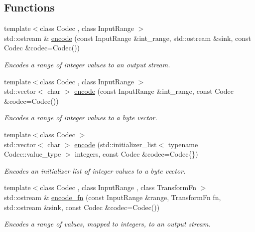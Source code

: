 \subsection*{Functions}
\begin{DoxyCompactItemize}
\item 
{\footnotesize template$<$class Codec , class Input\+Range $>$ }\\std\+::ostream \& \mbox{\hyperlink{namespaceirk_1_1coding_ab9ed90a54275b0b51b3b43a6943e0c5d}{encode}} (const Input\+Range \&int\+\_\+range, std\+::ostream \&sink, const Codec \&codec=Codec())
\begin{DoxyCompactList}\small\item\em Encodes a range of integer values to an output stream. \end{DoxyCompactList}\item 
{\footnotesize template$<$class Codec , class Input\+Range $>$ }\\std\+::vector$<$ char $>$ \mbox{\hyperlink{namespaceirk_1_1coding_a626fc8a444ee503d1210d1a72b14fec3}{encode}} (const Input\+Range \&int\+\_\+range, const Codec \&codec=Codec())
\begin{DoxyCompactList}\small\item\em Encodes a range of integer values to a byte vector. \end{DoxyCompactList}\item 
{\footnotesize template$<$class Codec $>$ }\\std\+::vector$<$ char $>$ \mbox{\hyperlink{namespaceirk_1_1coding_a5a8bcf925049c4f53e3912ed177cd8cc}{encode}} (std\+::initializer\+\_\+list$<$ typename Codec\+::value\+\_\+type $>$ integers, const Codec \&codec=Codec\{\})
\begin{DoxyCompactList}\small\item\em Encodes an initializer list of integer values to a byte vector. \end{DoxyCompactList}\item 
{\footnotesize template$<$class Codec , class Input\+Range , class Transform\+Fn $>$ }\\std\+::ostream \& \mbox{\hyperlink{namespaceirk_1_1coding_a7f925618ccd33c9c9255a9b9219e655f}{encode\+\_\+fn}} (const Input\+Range \&range, Transform\+Fn fn, std\+::ostream \&sink, const Codec \&codec=Codec())
\begin{DoxyCompactList}\small\item\em Encodes a range of values, mapped to integers, to an output stream. \end{DoxyCompactList}\item 

\end{DoxyCompactItemize}
